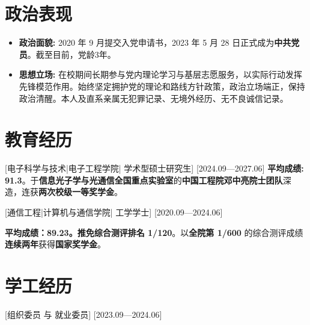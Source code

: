 \documentclass{resume}
\begin{document}


\ResumeTitle

\section{政治表现}
\begin{itemize}
	\item \textbf{政治面貌:} 2020 年 9 月提交入党申请书，2023 年 5 月 28 日正式成为\textbf{中共党员}。截至目前，党龄3年。
	\item \textbf{思想立场:} 在校期间长期参与党内理论学习与基层志愿服务，以实际行动发挥先锋模范作用。始终坚定拥护党的理论和路线方针政策，政治立场端正，保持政治清醒。本人及直系亲属无犯罪记录、无境外经历、无不良诚信记录。
\end{itemize}

\section{教育经历}
[\textnormal{电子科学与技术|电子工程学院|}  学术型硕士研究生]
[2024.09—2027.06]
\textbf{平均成绩: 91.3}。于\textbf{信息光子学与光通信全国重点实验室}的\textbf{中国工程院邓中亮院士团队}深造，连获\textbf{两次校级一等奖学金}。

[\textnormal{通信工程|计算机与通信学院|} 工学学士]
[2020.09—2024.06]

\textbf{平均成绩：89.23。推免综合测评排名 1/120}。以\textbf{全院第 1/600 }的综合测评成绩\textbf{连续两年}获得\textbf{国家奖学金}。

\section{学工经历}

[组织委员 与 就业委员]
[2023.09—2024.06] 
\end{document}

